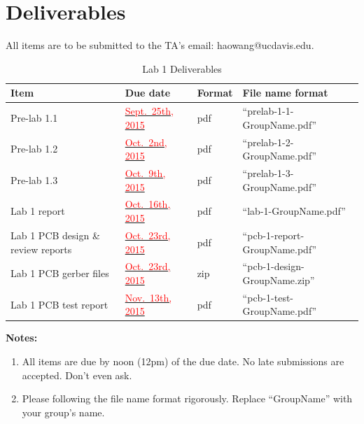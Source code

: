 \documentclass[letterpaper, 11pt]{article}
\newcommand{\due}[1]{\href{https://github.com/ucdart/UCD-EEC134/blob/master/support/schedule/eec134-schedule.pdf}{\textcolor{red}{#1}}}
\begin{document}
\newpage
\section{Deliverables}
All items are to be submitted to the TA's email: haowang@ucdavis.edu.  

\vspace{0.5cm}

\begin{table}[h]
	\footnotesize
	\caption{Lab 1 Deliverables}
	\renewcommand{\arraystretch}{1.2}
	\begin{tabular}{|m{1in}|l|m{0.45in}|m{2in}|}
		\hline
		\textbf{Item} & \textbf{Due date} & \textbf{Format} & \textbf{File name format} \\
		\hline \hline
		Pre-lab 1.1 & \due{Sept.~25th, 2015 } & pdf & ``prelab-1-1-GroupName.pdf'' \\
		\hline
		Pre-lab 1.2 & \due{Oct.~2nd, 2015} & pdf & ``prelab-1-2-GroupName.pdf''\\
		\hline
		Pre-lab 1.3 & \due{Oct.~9th, 2015} & pdf & ``prelab-1-3-GroupName.pdf''\\
		\hline
		Lab 1 report & \due{Oct.~16th, 2015} & pdf & ``lab-1-GroupName.pdf''\\
		\hline
		Lab 1 PCB design \& review reports & \due{Oct.~23rd, 2015} & pdf & ``pcb-1-report-GroupName.pdf''\\
		\hline
		Lab 1 PCB gerber files & \due{Oct.~23rd, 2015} & zip & ``pcb-1-design-GroupName.zip''\\
		\hline
		Lab 1 PCB test report & \due{Nov.~13th, 2015} & pdf & ``pcb-1-test-GroupName.pdf''\\
		\hline
	\end{tabular}
	\label{tab:deliverables}
\end{table}

\textbf{Notes:}
\begin{enumerate}
	\item All items are due by noon (12pm) of the due date. No late submissions are accepted. Don't even ask. 
	
	\item Please following the file name format rigorously. Replace ``GroupName'' with your group's name. 
\end{enumerate}
\end{document}
